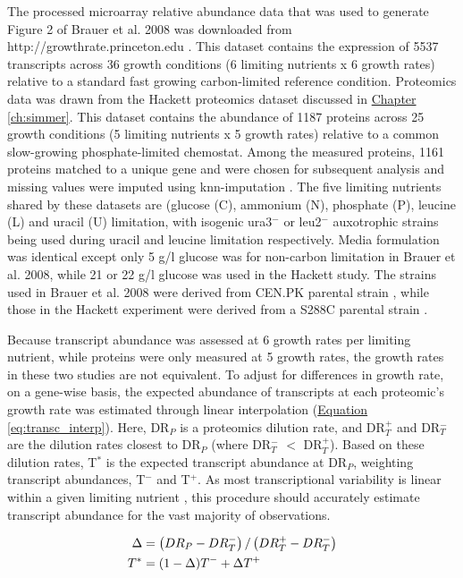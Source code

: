 The processed microarray relative abundance data that was used to generate Figure 2 of Brauer et al. 2008 was downloaded from http://growthrate.princeton.edu \cite{Brauer:2008jn}.  This dataset contains the expression of 5537 transcripts across 36 growth conditions (6 limiting nutrients x 6 growth rates) relative to a standard fast growing carbon-limited reference condition. Proteomics data was drawn from the Hackett proteomics dataset discussed in \hyperref[ch:simmer]{Chapter \ref{ch:simmer}}. This dataset contains the abundance of 1187 proteins across 25 growth conditions (5 limiting nutrients x 5 growth rates) relative to a common slow-growing phosphate-limited chemostat. Among the measured proteins, 1161 proteins matched to a unique gene and were chosen for subsequent analysis and missing values were imputed using knn-imputation \cite{Troyanskaya:2001uh}. The five limiting nutrients shared by these datasets are (glucose (C), ammonium (N), phosphate (P), leucine (L) and uracil (U) limitation, with isogenic ura3$^{-}$ or leu2$^{-}$ auxotrophic strains being used during uracil and leucine limitation respectively. Media formulation was identical except only 5 g/l glucose was for non-carbon limitation in Brauer et al. 2008, while 21 or 22 g/l glucose was used in the Hackett study. The strains used in Brauer et al. 2008 were derived from CEN.PK parental strain \cite{vanDijkenJP:2000er}, while those in the Hackett experiment were derived from a S288C parental strain \cite{Winston:1995io}.

Because transcript abundance was assessed at 6 growth rates per limiting nutrient, while proteins were only measured at 5 growth rates, the growth rates in these two studies are not equivalent. To adjust for differences in growth rate, on a gene-wise basis, the expected abundance of transcripts at each proteomic's growth rate was estimated through linear interpolation (\hyperref[eq:transc_interp]{Equation \ref{eq:transc_interp}}). Here, DR$_{P}$ is a proteomics dilution rate, and DR$_{T}^{+}$ and DR$_{T}^{-}$ are the dilution rates closest to DR$_{P}$ (where DR$_{T}^{-}$ $<$ DR$_{T}^{+}$). Based on these dilution rates, T$^{*}$ is the expected transcript abundance at DR$_{P}$, weighting transcript abundances, T$^{-}$ and T$^{+}$. As most transcriptional variability is linear within a given limiting nutrient \cite{Brauer:2008jn}, this procedure should accurately estimate transcript abundance for the vast majority of observations. 

\begin{align}
\Delta &= \left(DR_{P} - DR_{T}^{-}\right) / \left(DR_{T}^{+} - DR_{T}^{-}\right)\notag\\
T^{*} &= (1-\Delta)T^{-} + \Delta T^{+}\label{eq:transc_interp}
\end{align}

